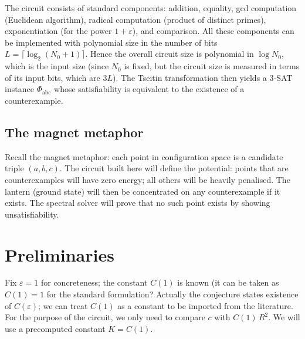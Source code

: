 \documentclass[11pt,a4paper]{article}
\begin{document}
The circuit consists of standard components: addition, equality, gcd computation (Euclidean algorithm), radical computation (product of distinct primes), exponentiation (for the power $1+\varepsilon$), and comparison. All these components can be implemented with polynomial size in the number of bits $L = \lceil \log_2(N_0+1)\rceil$. Hence the overall circuit size is polynomial in $\log N_0$, which is the input size (since $N_0$ is fixed, but the circuit size is measured in terms of its input bits, which are $3L$). The Tseitin transformation then yields a 3‑SAT instance $\Phi_{\text{abc}}$ whose satisfiability is equivalent to the existence of a counterexample.

\subsection{The magnet metaphor}

Recall the magnet metaphor: each point in configuration space is a candidate triple $(a,b,c)$. The circuit built here will define the potential: points that are counterexamples will have zero energy; all others will be heavily penalised. The lantern (ground state) will then be concentrated on any counterexample if it exists. The spectral solver will prove that no such point exists by showing unsatisfiability.

\section{Preliminaries}

Fix $\varepsilon = 1$ for concreteness; the constant $C(1)$ is known (it can be taken as $C(1)=1$ for the standard formulation? Actually the conjecture states existence of $C(\varepsilon)$; we can treat $C(1)$ as a constant to be imported from the literature. For the purpose of the circuit, we only need to compare $c$ with $C(1)\,R^{2}$. We will use a precomputed constant $K = C(1)$.
\end{document}

